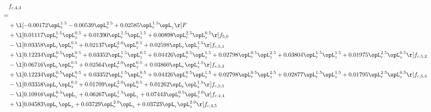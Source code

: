 \begin{alignat}{2} 
\label{eq:f_43_2} 
& f_{c,4,3} \nonumber \\ 
 = \\ 
& + \l[  -0.00172 \opL_r^{1.5}   -0.00539 \opL_r^{2.5} +  0.02585 \opL_r^{1.5} \opL_z  \r] F \nonumber \\ 
& + \l[  0.01117 \opL_r^{1.5} \opL_z^{0.5} +  0.01390 \opL_r^{1.5} \opL_z^{1.5} +  0.00898 \opL_r^{2.5} \opL_z^{0.5}  \r] f_{5,0} \nonumber \\ 
& - \l[  0.03358 \opL_r \opL_z^{0.5} +  0.02137 \opL_r^{2.0} \opL_z^{0.5} +  0.02598 \opL_r \opL_z^{1.5}  \r] f_{c,5,1} \nonumber \\ 
& + \l[  0.12234 \opL_r^{0.5} \opL_z^{0.5} +  0.03352 \opL_r^{1.5} \opL_z^{0.5} +  0.04426 \opL_r^{0.5} \opL_z^{1.5} +  0.02798 \opL_r^{0.5} \opL_z^{2.5} +  0.03804 \opL_r^{1.5} \opL_z^{1.5} +  0.01975 \opL_r^{2.5} \opL_z^{0.5}  \r] f_{c,5,2} \nonumber \\ 
& - \l[  0.06716 \opL_r \opL_z^{0.5} +  0.02564 \opL_r^{2.0} \opL_z^{0.5} +  0.03860 \opL_r \opL_z^{1.5}  \r] f_{c,5,3} \nonumber \\ 
& + \l[  0.12234 \opL_r^{0.5} \opL_z^{0.5} +  0.03352 \opL_r^{1.5} \opL_z^{0.5} +  0.04426 \opL_r^{0.5} \opL_z^{1.5} +  0.02798 \opL_r^{0.5} \opL_z^{2.5} +  0.02877 \opL_r^{1.5} \opL_z^{1.5} +  0.01795 \opL_r^{2.5} \opL_z^{0.5}  \r] f_{c,5,4} \nonumber \\ 
& - \l[  0.03358 \opL_r \opL_z^{0.5} +  0.01709 \opL_r^{2.0} \opL_z^{0.5} +  0.01262 \opL_r \opL_z^{1.5}  \r] f_{c,5,5} \nonumber \\ 
& - \l[  0.10916 \opL_r^{0.5} \opL_z +  0.06267 \opL_r^{1.5} \opL_z +  0.07443 \opL_r^{0.5} \opL_z^{2.0}  \r] f_{c,4,4} \nonumber \\ 
& + \l[  0.04583 \opL_r \opL_z +  0.03729 \opL_r^{2.0} \opL_z +  0.03723 \opL_r \opL_z^{2.0}  \r] f_{c,4,5} \nonumber \\ 
\end{alignat} 


